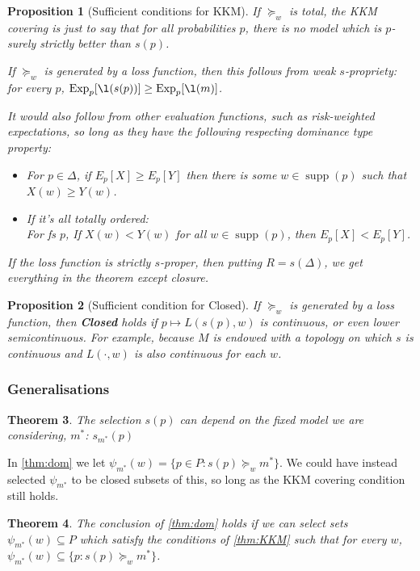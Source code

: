 \documentclass[11pt]{article}
\newtheorem{theorem}{Theorem}[section]
\newtheorem{proposition}[theorem]{Proposition}
\theoremstyle{definition}
\theoremstyle{remark}
\newcommand{\supp}{\operatorname{supp}}
\newcommand{\Exp}{\operatorname{Exp}}
\begin{document}
\begin{proposition}[Sufficient conditions for KKM]
		If $\succeq_w$ is total, the KKM covering is just to say that for all probabilities $p$, there is no model which is $p$-surely strictly better than $s(p)$.		
		
		If $\succeq_w$ is generated by a loss function, then this follows from weak $s$-propriety: 
		for every $p$, $\Exp_p[\l(s(p))]\geq\Exp_p[\l(m)]$. 
	
		
		It would also follow from other evaluation functions, such as risk-weighted expectations, so long as they have the following respecting dominance type property: 
		\begin{itemize}
			\item For $p\in\Delta$, if $E_p[X]\geq E_p[Y]$ then there is some $w\in\supp(p)$ such that $X(w)\geq Y(w)$.
			\item If it's all totally ordered:\\
			For fs $p$, If $X(w)< Y(w)$ for all $w\in\supp(p)$, then $E_p[X]<E_p[Y]$. 
		\end{itemize}
		
		If the loss function is \emph{strictly} $s$-proper, then putting $R=s(\Delta)$, we get everything in the theorem except closure. 
\end{proposition}

\begin{proposition}[Sufficient condition for Closed]
	If $\succeq_w$ is generated by a loss function, then \textbf{Closed} holds if $p\mapsto L(s(p),w)$ is continuous, or even lower semicontinuous. For example, because $M$ is endowed with a topology on which $s$ is continuous and $L(\cdot,w)$ is also continuous for each $w$.  
\end{proposition}

\subsubsection{Generalisations}
\begin{theorem}
	The selection $s(p)$ can depend on the fixed model we are considering, $m^*$: $s_{m^*}(p)$
\end{theorem}

In \cref{thm:dom} we let $\psi_{m^*}(w)=\{p\in P:s(p)\succeq_w m^*\}$. We could have instead selected $\psi_{m^*}$ to be closed subsets of this, so long as the KKM covering condition still holds. 
\begin{theorem}
	The conclusion of \cref{thm:dom} holds if we can select sets $\psi_{m^*}(w)\subseteq P$ which satisfy the conditions of \cref{thm:KKM} such that for every $w$, $\psi_{m^*}(w)\subseteq\{p: s(p)\succeq_w m^*\}$. 
\end{theorem}
\end{document}
